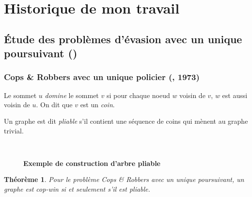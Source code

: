 \documentclass[12pt]{article}
\newtheorem{theoreme}{Théorème}
\newcommand{\cp}{Cops \& Robbers\xspace}
\begin{document}
\section{Historique de mon travail}

\subsection{\'Etude des problèmes d'évasion avec un unique poursuivant (\cite{komarov2015hunter})}

\subsubsection{\cp avec un unique policier (\cite{nowakowski1983vertex}, 1973)}

Le sommet $u$ \emph{domine} le sommet $v$ si pour chaque noeud $w$ voisin de $v$, $w$ est aussi voisin de $u$. On dit que $v$ est un \emph{coin}.

Un graphe est dit \emph{pliable} s'il contient une séquence de coins qui mènent au graphe trivial.

\begin{figure}[h!]
    \centering
    \quad\quad
    \quad\quad
     \\
    \quad\quad
    \quad\quad
    \quad\quad
    
    \label{fig:pliable}
    \caption{\textbf{Exemple de construction d'arbre pliable}}
\end{figure}

\begin{theoreme}
    Pour le problème \cp avec un unique poursuivant, un graphe est cop-win si et seulement s'il est pliable.
\end{theoreme}
\end{document}
